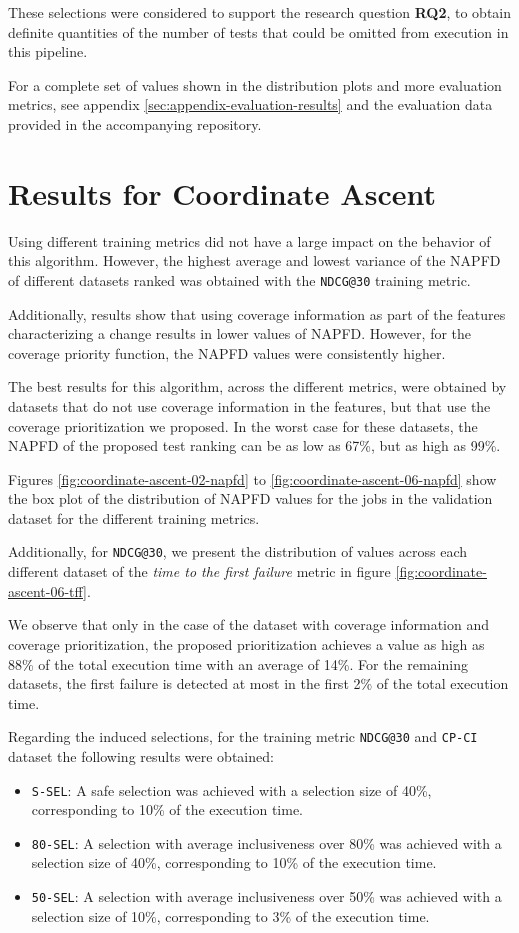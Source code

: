 These selections were considered to support the research question \textbf{RQ2}, to obtain
definite quantities of the number of tests that could be omitted from execution
in this pipeline.

For a complete set of values shown in the distribution plots and more evaluation metrics, see appendix \ref{sec:appendix-evaluation-results}
and the evaluation data provided in the accompanying repository.

\section{Results for Coordinate Ascent}

Using different training metrics did not have a large impact on the behavior of this algorithm. 
However, the highest average and lowest variance of the NAPFD of different datasets ranked was obtained with the 
\texttt{NDCG@30} training metric.

Additionally, results show that using coverage information as part of the features characterizing a change
results in lower values of NAPFD. However, for the coverage priority function, the NAPFD values were 
consistently higher.

The best results for this algorithm, across the different metrics, were obtained by datasets that do not
use coverage information in the features, but that use the coverage prioritization we proposed. In the worst case
for these datasets, the NAPFD of the proposed test ranking can be as low as 67\%, but as high as 99\%.

Figures \ref{fig:coordinate-ascent-02-napfd} to \ref{fig:coordinate-ascent-06-napfd} show the box plot of the distribution
of NAPFD values for the jobs in the validation dataset for the different training metrics. 

Additionally, for \texttt{NDCG@30}, we present the distribution of values 
across each different dataset of the \emph{time to the first failure} metric in figure \ref{fig:coordinate-ascent-06-tff}. 

We observe that only in the case of the dataset with coverage information and coverage prioritization, the proposed prioritization
achieves a value as high as 88\% of the total execution time with an average of 14\%. For the remaining datasets, the first failure is detected
at most in the first 2\% of the total execution time.

Regarding the induced selections, for the training metric \texttt{NDCG@30} and \texttt{CP-CI} dataset the following results were obtained:
\begin{itemize}
    \item \texttt{S-SEL}: A safe selection was achieved with a selection size of 40\%, corresponding to 10\% of the execution time.
    \item \texttt{80-SEL}: A selection with average inclusiveness over 80\% was achieved with a selection size of 40\%, corresponding to 10\% of the execution time.
    \item \texttt{50-SEL}: A selection with average inclusiveness over 50\% was achieved with a selection size of 10\%, corresponding to 3\% of the execution time.
\end{itemize}

